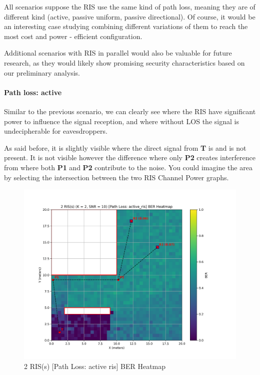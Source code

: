 All scenarios suppose the RIS use the same kind of path loss, meaning they are of different kind (active, passive uniform, passive directional). Of course, it would be an interesting case studying combining different variations of them to reach the most cost and power - efficient configuration.

Additional scenarios with RIS in parallel would also be valuable for future research, as they would likely show promising security characteristics based on our preliminary analysis.

\paragraph*{Path loss: active}
Similar to the previous scenario, we can clearly see where the RIS have significant power to influence the signal reception, and where without LOS the signal is undecipherable for eavesdroppers.

As said before, it is slightly visible where the direct signal from \textbf{T} is and is not present. It is not visible however the difference where only \textbf{P2} creates interference from where both \textbf{P1} and \textbf{P2} contribute to the noise. You could imagine the area by selecting the intersection between the two RIS Channel Power graphs.

\begin{figure}[H]
  \centering
  \includegraphics[width=0.7\linewidth]{imgs/heatmap-simulations/2 RIS(s) (K = 2, SNR = 10) [Path Loss_ active_ris] BER Heatmap.png}
  \caption{2 RIS(s) [Path Loss: active ris] BER Heatmap}
\end{figure}

